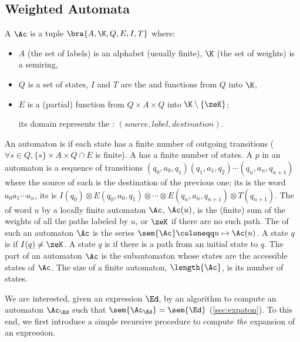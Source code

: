 \documentclass[a4paper,USenglish]{lipics}
\begin{document}
\subsection{Weighted Automata}

\begin{Definition}[Automaton]
  A  $\Ac$ is a tuple $\bra{A, \K, Q, E, I, T}$
  where:
  \begin{itemize}
  \item $A$ (the set of labels) is an alphabet (usually finite),
     $\K$ (the set of weights) is a
    semiring,
  \item $Q$ is a set of states, $I$ and $T$
    are the  and  functions from $Q$ into $\K$,
  \item $E$ is a (partial) function from $Q \times A \times Q$ into
    $\K \setminus \{\zeK\}$;

    its domain represents the :
    $(\mathit{source}, \mathit{label}, \mathit{destination})$.
  \end{itemize}
\end{Definition}
An automaton is  if each state has a finite number of
outgoing transitions ($\forall s\in Q, \{s\} \times A \times Q \cap E$ is
finite).  A  has a finite number of states.
A  $p$ in an automaton is a sequence of transitions
$(q_0, a_0, q_1)(q_1, a_1, q_2)\cdots(q_n, a_n, q_{n+1})$ where the source
of each is the destination of the previous one; its  is the word
$a_0a_1\cdots a_n$, its  is
$I(q_0) \otimes E(q_0, a_0, q_1) \otimes \cdots \otimes E(q_n, a_n, q_{n+1})
\otimes T(q_{n+1})$.
The  of word $u$ by a locally finite automaton $\Ac$,
$\Ac(u)$, is the (finite) sum of the weights of all the paths labeled by
$u$, or $\zeK$ if there are no such path.  The  of such an
automaton $\Ac$ is the series $\sem{\Ac} \coloneqq u \mapsto \Ac(u)$.  A
state $q$ is  if $I(q) \neq \zeK$.  A state $q$ is
 if there is a path from an initial state to $q$.  The  part
of an automaton $\Ac$ is the subautomaton whose states are the accessible
states of $\Ac$.  The size of a finite automaton, $\length{\Ac}$, is its
number of states.



We are interested, given an expression $\Ed$, by an algorithm to compute an
automaton $\Ac_\Ed$ such that $\sem{\Ac_\Ed} = \sem{\Ed}$
(\cref{sec:expaton}).  To this end, we first introduce a simple recursive
procedure to compute \emph{the} expansion of an expression.
\end{document}
